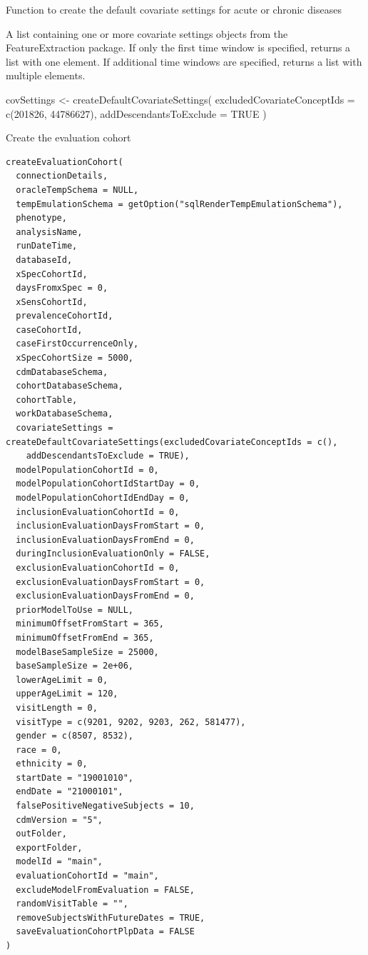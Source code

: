 \documentclass[a4paper]{book}
\begin{document}
%
\begin{Details}
Function to create the default covariate settings for acute or chronic diseases
\end{Details}
%
\begin{Value}
A list containing one or more covariate settings objects from the FeatureExtraction package.
If only the first time window is specified, returns a list with one element.
If additional time windows are specified, returns a list with multiple elements.
\end{Value}
%
\begin{Examples}
\begin{ExampleCode}
covSettings <- createDefaultCovariateSettings(
  excludedCovariateConceptIds = c(201826, 44786627),
  addDescendantsToExclude = TRUE
)

\end{ExampleCode}
\end{Examples}
%
\begin{Description}
Create the evaluation cohort
\end{Description}
%
\begin{Usage}
\begin{verbatim}
createEvaluationCohort(
  connectionDetails,
  oracleTempSchema = NULL,
  tempEmulationSchema = getOption("sqlRenderTempEmulationSchema"),
  phenotype,
  analysisName,
  runDateTime,
  databaseId,
  xSpecCohortId,
  daysFromxSpec = 0,
  xSensCohortId,
  prevalenceCohortId,
  caseCohortId,
  caseFirstOccurrenceOnly,
  xSpecCohortSize = 5000,
  cdmDatabaseSchema,
  cohortDatabaseSchema,
  cohortTable,
  workDatabaseSchema,
  covariateSettings = createDefaultCovariateSettings(excludedCovariateConceptIds = c(),
    addDescendantsToExclude = TRUE),
  modelPopulationCohortId = 0,
  modelPopulationCohortIdStartDay = 0,
  modelPopulationCohortIdEndDay = 0,
  inclusionEvaluationCohortId = 0,
  inclusionEvaluationDaysFromStart = 0,
  inclusionEvaluationDaysFromEnd = 0,
  duringInclusionEvaluationOnly = FALSE,
  exclusionEvaluationCohortId = 0,
  exclusionEvaluationDaysFromStart = 0,
  exclusionEvaluationDaysFromEnd = 0,
  priorModelToUse = NULL,
  minimumOffsetFromStart = 365,
  minimumOffsetFromEnd = 365,
  modelBaseSampleSize = 25000,
  baseSampleSize = 2e+06,
  lowerAgeLimit = 0,
  upperAgeLimit = 120,
  visitLength = 0,
  visitType = c(9201, 9202, 9203, 262, 581477),
  gender = c(8507, 8532),
  race = 0,
  ethnicity = 0,
  startDate = "19001010",
  endDate = "21000101",
  falsePositiveNegativeSubjects = 10,
  cdmVersion = "5",
  outFolder,
  exportFolder,
  modelId = "main",
  evaluationCohortId = "main",
  excludeModelFromEvaluation = FALSE,
  randomVisitTable = "",
  removeSubjectsWithFutureDates = TRUE,
  saveEvaluationCohortPlpData = FALSE
)
\end{verbatim}
\end{Usage}
\end{document}
